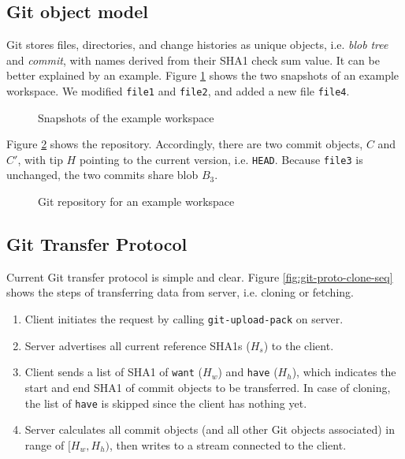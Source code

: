 \documentclass[copyrightwanted=false]{sigplanconf}
\begin{document}
\subsection{Git object model}
Git stores files, directories, and change histories as unique objects, i.e.
\emph{blob} \emph{tree} and \emph{commit}, with names derived from their SHA1
check sum value\cite{gitobj}.
It can be better explained by an example.
Figure \ref{fig:workspace} shows the two snapshots of an example workspace.
We modified \verb|file1| and \verb|file2|, and added a new file \verb|file4|.
\begin{figure}[htpb]
  \centering
  
  \caption{Snapshots of the example workspace}
  \label{fig:workspace}
\end{figure}

Figure \ref{fig:git-repo} shows the repository.
Accordingly, there are two commit objects, $C$ and $C'$, with tip $H$ pointing
to the current version, i.e. \verb|HEAD|.
Because \verb|file3| is unchanged, the two commits share blob $B_3$.

\begin{figure}[htpb]
  \centering
  
  \caption{Git repository for an example workspace}
  \label{fig:git-repo}
\end{figure}

\subsection{Git Transfer Protocol}
Current Git transfer protocol is simple and clear\cite{tran-protocol}.
Figure \ref{fig:git-proto-clone-seq} shows the steps of transferring data from
server, i.e. cloning or fetching.

\begin{enumerate}
  \item Client initiates the request by calling \verb|git-upload-pack| on
    server.

  \item Server advertises all current reference SHA1s ($H_s$) to the client.

  \item Client sends a list of SHA1 of \verb|want| ($H_w$) and \verb|have|
    ($H_h$), which indicates the start and end SHA1 of commit objects to be
    transferred.
    In case of cloning, the list of \verb|have| is skipped since the client has
    nothing yet.

  \item Server calculates all commit objects (and all other Git objects
    associated) in range of $[H_w, H_h)$, then writes to a stream connected to
    the client.
\end{enumerate}
\end{document}
